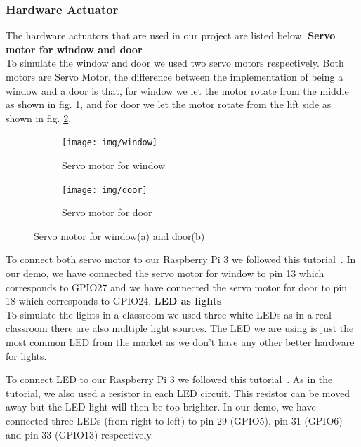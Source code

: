 \documentclass[runningheads]{llncs}
\begin{document}
\subsubsection{Hardware Actuator}\hfill
\label{hard_imp:actuator}
\newline
The hardware actuators that are used in our project are listed below.
\newline
\textbf{Servo motor for window and door~\cite{m_actuator}}\\
To simulate the window and door we used two servo motors respectively. Both motors are Servo Motor, the difference between the implementation of being a window and a door is that, for window we let the motor rotate from the middle as shown in fig. \ref{pic:window}, and for door we let the motor rotate from the lift side as shown in fig. \ref{pic:door}. 
\begin{figure}[H]
\centering
\begin{subfigure}{.5\textwidth}
  \centering
  \texttt{[image: img/window]}
  \caption{Servo motor for window}
  \label{pic:window}
\end{subfigure}%
\begin{subfigure}{.5\textwidth}
  \centering
  \texttt{[image: img/door]}
  \caption{Servo motor for door}
  \label{pic:door}
\end{subfigure}
\caption{Servo motor for window(a) and door(b)}
\label{pic:sm}
\end{figure}

To connect both servo motor to our Raspberry Pi 3 we followed this tutorial~\cite{m_tutorial}. In our demo, we have connected the servo motor for window to pin 13 which corresponds to GPIO27 and we have connected the servo motor for door to pin 18 which corresponds to GPIO24.
\newline
\textbf{LED as lights}\\
To simulate the lights in a classroom we used three white LEDs as in a real classroom there are also multiple light sources. The LED we are using is just the most common LED from the market as we don’t have any other better hardware for lights.

To connect LED to our Raspberry Pi 3 we followed this tutorial~\cite{led_tutorial}. As in the tutorial, we also used a resistor in each LED circuit. This resistor can be moved away but the LED light will then be too brighter. In our demo, we have connected three LEDs (from right to left) to pin 29 (GPIO5), pin 31 (GPIO6) and pin 33 (GPIO13) respectively.
\end{document}
